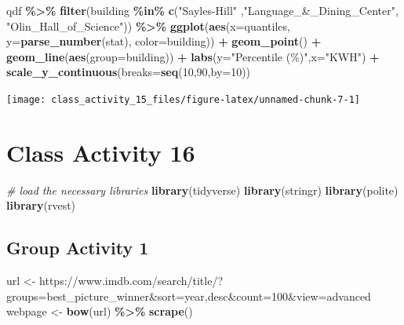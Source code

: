 \documentclass[
]{book}
\newenvironment{Shaded}{\begin{snugshade}}{\end{snugshade}}
\newcommand{\AttributeTok}[1]{\textcolor[rgb]{0.13,0.29,0.53}{#1}}
\newcommand{\CommentTok}[1]{\textcolor[rgb]{0.56,0.35,0.01}{\textit{#1}}}
\newcommand{\DecValTok}[1]{\textcolor[rgb]{0.00,0.00,0.81}{#1}}
\newcommand{\FunctionTok}[1]{\textcolor[rgb]{0.13,0.29,0.53}{\textbf{#1}}}
\newcommand{\NormalTok}[1]{#1}
\newcommand{\OtherTok}[1]{\textcolor[rgb]{0.56,0.35,0.01}{#1}}
\newcommand{\SpecialCharTok}[1]{\textcolor[rgb]{0.81,0.36,0.00}{\textbf{#1}}}
\newcommand{\StringTok}[1]{\textcolor[rgb]{0.31,0.60,0.02}{#1}}
\begin{document}
\begin{Shaded}
\begin{Highlighting}[]
\NormalTok{qdf }\SpecialCharTok{\%\textgreater{}\%} 
  \FunctionTok{filter}\NormalTok{(building }\SpecialCharTok{\%in\%} \FunctionTok{c}\NormalTok{(}\StringTok{"Sayles{-}Hill"}\NormalTok{ ,}\StringTok{"Language\_\&\_Dining\_Center"}\NormalTok{, }\StringTok{"Olin\_Hall\_of\_Science"}\NormalTok{))  }\SpecialCharTok{\%\textgreater{}\%}  
  \FunctionTok{ggplot}\NormalTok{(}\FunctionTok{aes}\NormalTok{(}\AttributeTok{x=}\NormalTok{quantiles, }\AttributeTok{y=}\FunctionTok{parse\_number}\NormalTok{(stat), }\AttributeTok{color=}\NormalTok{building)) }\SpecialCharTok{+}
  \FunctionTok{geom\_point}\NormalTok{() }\SpecialCharTok{+} 
  \FunctionTok{geom\_line}\NormalTok{(}\FunctionTok{aes}\NormalTok{(}\AttributeTok{group=}\NormalTok{building)) }\SpecialCharTok{+} 
  \FunctionTok{labs}\NormalTok{(}\AttributeTok{y=}\StringTok{"Percentile (\%)"}\NormalTok{,}\AttributeTok{x=}\StringTok{"KWH"}\NormalTok{) }\SpecialCharTok{+}
  \FunctionTok{scale\_y\_continuous}\NormalTok{(}\AttributeTok{breaks=}\FunctionTok{seq}\NormalTok{(}\DecValTok{10}\NormalTok{,}\DecValTok{90}\NormalTok{,}\AttributeTok{by=}\DecValTok{10}\NormalTok{))}
\end{Highlighting}
\end{Shaded}

\texttt{[image: class\_activity\_15\_files/figure-latex/unnamed-chunk-7-1]}

\hypertarget{class-activity-16}{%
\chapter{Class Activity 16}\label{class-activity-16}}

\begin{Shaded}
\begin{Highlighting}[]
\CommentTok{\# load the necessary libraries}
\FunctionTok{library}\NormalTok{(tidyverse)}
\FunctionTok{library}\NormalTok{(stringr)}
\FunctionTok{library}\NormalTok{(polite)}
\FunctionTok{library}\NormalTok{(rvest)}
\end{Highlighting}
\end{Shaded}

\hypertarget{group-activity-1-3}{%
\section{Group Activity 1}\label{group-activity-1-3}}

\begin{Shaded}
\begin{Highlighting}[]
\NormalTok{url }\OtherTok{\textless{}{-}} \StringTok{\textquotesingle{}https://www.imdb.com/search/title/?groups=best\_picture\_winner\&sort=year,desc\&count=100\&view=advanced\textquotesingle{}}
\NormalTok{webpage }\OtherTok{\textless{}{-}} \FunctionTok{bow}\NormalTok{(url) }\SpecialCharTok{\%\textgreater{}\%} \FunctionTok{scrape}\NormalTok{()}
\end{Highlighting}
\end{Shaded}
\end{document}
